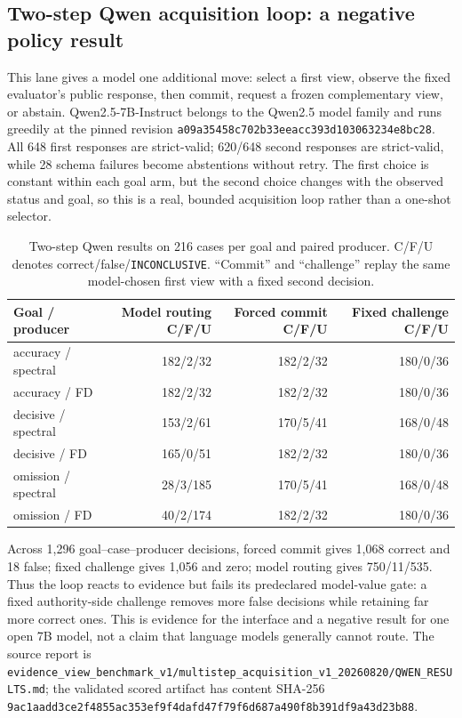 \documentclass{article}
\newcommand{\INC}{\texttt{INCONCLUSIVE}\xspace}
\begin{document}
\subsection{Two-step Qwen acquisition loop: a negative policy result}
This lane gives a model one additional move: select a first view, observe the fixed evaluator's
public response, then commit, request a frozen complementary view, or abstain. Qwen2.5-7B-Instruct
belongs to the Qwen2.5 model family \citep{yang2024qwen25} and runs greedily at the pinned revision
\texttt{a09a35458c702b33eeacc393d103063234e8bc28}. All 648 first responses are strict-valid; 620/648
second responses are strict-valid, while 28 schema failures become abstentions without retry. The
first choice is constant within each goal arm, but the second choice changes with the observed
status and goal, so this is a real, bounded acquisition loop rather than a one-shot selector.

\begin{table}[ht]
\centering\scriptsize
\caption{Two-step Qwen results on 216 cases per goal and paired producer. C/F/U denotes
correct/false/\INC. ``Commit'' and ``challenge'' replay the same model-chosen first view with a
fixed second decision.}
\label{tab:qwen-two-step}
\begin{tabular}{lrrr}
\toprule
Goal / producer & Model routing C/F/U & Forced commit C/F/U & Fixed challenge C/F/U \\
\midrule
accuracy / spectral & 182/2/32 & 182/2/32 & 180/0/36 \\
accuracy / FD & 182/2/32 & 182/2/32 & 180/0/36 \\
decisive / spectral & 153/2/61 & 170/5/41 & 168/0/48 \\
decisive / FD & 165/0/51 & 182/2/32 & 180/0/36 \\
omission / spectral & 28/3/185 & 170/5/41 & 168/0/48 \\
omission / FD & 40/2/174 & 182/2/32 & 180/0/36 \\
\bottomrule
\end{tabular}
\end{table}

Across 1,296 goal--case--producer decisions, forced commit gives 1,068 correct and 18 false;
fixed challenge gives 1,056 and zero; model routing gives 750/11/535. Thus the loop reacts to
evidence but fails its predeclared model-value gate: a fixed authority-side challenge removes more
false decisions while retaining far more correct ones. This is evidence for the interface and a
negative result for one open 7B model, not a claim that language models generally cannot route.
The source report is
\nolinkurl{evidence_view_benchmark_v1/multistep_acquisition_v1_20260820/QWEN_RESULTS.md}; the
validated scored artifact has content SHA-256
\nolinkurl{9ac1aadd3ce2f4855ac353ef9f4dafd47f79f6d687a490f8b391df9a43d23b88}.
\end{document}
